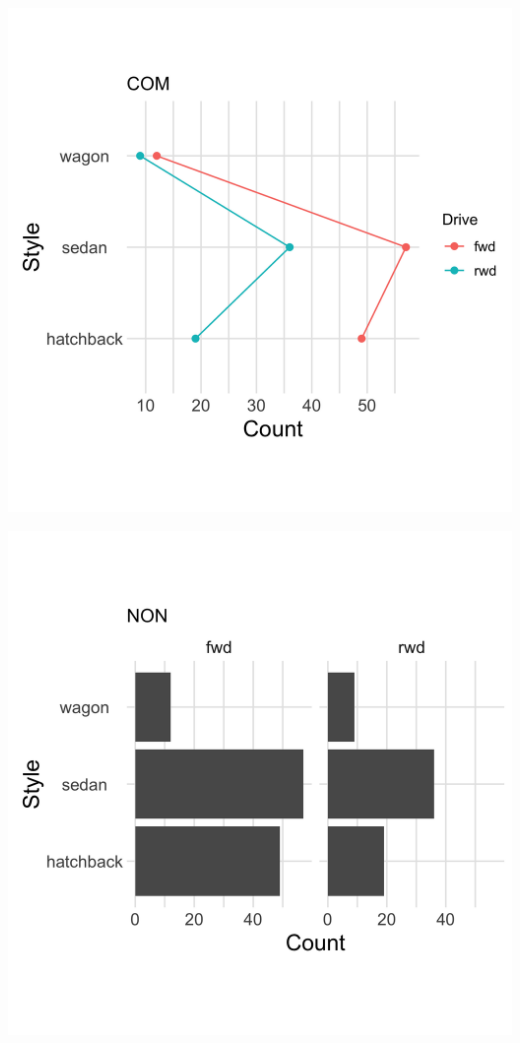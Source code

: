 \documentclass[]{article}
\newcommand{\setwidth}{0.40\textwidth}
\begin{document}
\centering


\hspace*{\fill}
\begin{minipage}{\setwidth}
  \centering
  \includegraphics[width=1.00\textwidth]{../images/01_common_scale}
\end{minipage} %
\hfill\vline\hfill
\begin{minipage}{\setwidth}
  \centering
  \includegraphics[width=1.00\textwidth]{../images/02_nonaligned_scale}
\end{minipage}
\hspace*{\fill}
\end{document}
